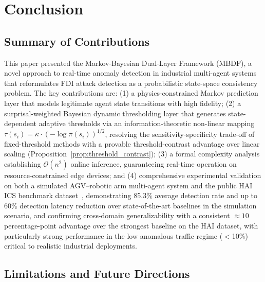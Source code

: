 \documentclass[manuscript,screen,review]{acmart}
\begin{document}
\section{Conclusion}
\label{sec:conclusion}

\subsection{Summary of Contributions}
\label{subsec:contributions_summary}

This paper presented the Markov-Bayesian Dual-Layer
Framework (MBDF), a novel approach to real-time anomaly
detection in industrial multi-agent systems that
reformulates FDI attack detection as a probabilistic
state-space consistency problem. The key contributions
are: (1) a physics-constrained Markov prediction layer
that models legitimate agent state transitions with
high fidelity; (2) a surprisal-weighted Bayesian dynamic
thresholding layer that generates state-dependent adaptive
thresholds via an information-theoretic non-linear mapping
$\tau(s_i) = \kappa \cdot (-\log \pi(s_i))^{1/2}$,
resolving the sensitivity-specificity trade-off of
fixed-threshold methods with a provable threshold-contrast
advantage over linear scaling
(Proposition~\ref{prop:threshold_contrast}); (3) a formal
complexity analysis establishing $\mathcal{O}(n^2)$ online
inference, guaranteeing real-time operation on
resource-constrained edge devices; and (4) comprehensive
experimental validation on both a simulated AGV--robotic
arm multi-agent system and the public HAI ICS benchmark
dataset~\cite{ref_hai}, demonstrating 85.3\% average
detection rate and up to 60\% detection latency reduction
over state-of-the-art baselines in the simulation scenario,
and confirming cross-domain generalizability with a
consistent ${\approx}10$ percentage-point advantage over
the strongest baseline on the HAI dataset, with
particularly strong performance in the low anomalous
traffic regime ($<$10\%) critical to realistic
industrial deployments.

\subsection{Limitations and Future Directions}
\label{subsec:limitations}
\end{document}
